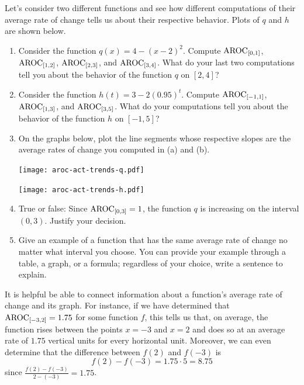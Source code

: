 \documentclass[nooutcomes]{ximera}
\begin{document}
\begin{exploration}
Let's consider two different functions and see how different computations of their average rate of change tells us about their respective behavior. Plots of $q$  and $h$ are shown below.

\begin{enumerate}[label=\alph*.]
\item Consider the function $q(x) = 4-(x-2)^2$. Compute $\mathrm{AROC}_{[0,1]}$, $\mathrm{AROC}_{[1,2]}$, $\mathrm{AROC}_{[2,3]}$, and $\mathrm{AROC}_{[3,4]}$. What do your last two computations tell you about the behavior of the function $q$ on $[2,4]$?


\item Consider the function $h(t) = 3 - 2(0.95)^t$. Compute $\mathrm{AROC}_{[-1,1]}$, $\mathrm{AROC}_{[1,3]}$, and $\mathrm{AROC}_{[3,5]}$. What do your computations tell you about the behavior of the function $h$ on $[-1,5]$?

\item On the graphs below, plot the line segments whose respective slopes are the average rates of change you computed in (a) and (b).

\begin{image}
\texttt{[image: aroc-act-trends-q.pdf]}
\end{image}

\begin{image}
\texttt{[image: aroc-act-trends-h.pdf]}
\end{image}

\item True or false: Since $\mathrm{AROC}_{[0,3]} = 1$, the function $q$ is increasing on the interval $(0,3)$.  Justify your decision.
\item Give an example of a function that has the same average rate of change no matter what interval you choose. You can provide your example through a table, a graph, or a formula; regardless of your choice, write a sentence to explain.
\end{enumerate}

\end{exploration}

It is helpful be able to connect information about a function's average rate of change and its graph.  For instance, if we have determined that $\mathrm{AROC}_{[-3,2]} = 1.75$ for some function $f$, this tells us that, on average, the function rises between the points $x = -3$ and $x = 2$ and does so at an average rate of $1.75$ vertical units for every horizontal unit.  Moreover, we can even determine that the difference between $f(2)$ and $f(-3)$ is%
\begin{equation*}
f(2)-f(-3) = 1.75 \cdot 5 = 8.75
\end{equation*}
since $\frac{f(2)-f(-3)}{2-(-3)} = 1.75$.
\end{document}
